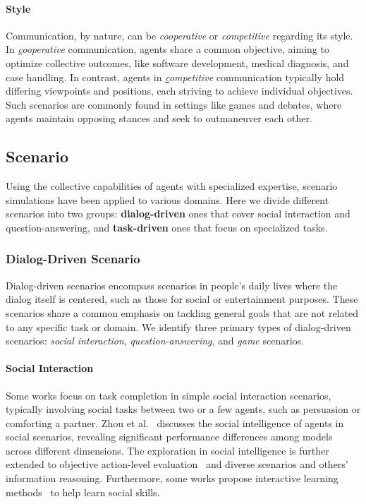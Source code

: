 \paragraph{Style}
Communication, by nature, can be \textit{cooperative} or \textit{competitive} regarding its style.
In \textit{{\ul cooperative}} communication, agents share a common objective, aiming to optimize collective outcomes, like software development\cite{dong2023self,qian2024chatdev,hong2023metagpt}, medical diagnosis\cite{tang2023medagents,fan2024ai}, and case handling\cite{hamilton2023blind,sun2024lawluo}.
In contrast, agents in \textit{{\ul competitive}} communication typically hold differing viewpoints and positions, each striving to achieve individual objectives. Such scenarios are commonly found in settings like games\cite{xu2023exploring,du2024helmsman,wang2023avalon} and debates\cite{xiong2023examining,liang2023encouraging,fu2023improving}, where agents maintain opposing stances and seek to outmaneuver each other.

\subsection{Scenario}\label{subsec:sce_sce}
Using the collective capabilities of agents with specialized expertise, scenario simulations have been applied to various domains. Here we divide different scenarios into two groups: \textbf{dialog-driven} ones that cover social interaction and question-answering, and \textbf{task-driven} ones that focus on specialized tasks.

\subsubsection{Dialog-Driven Scenario}
Dialog-driven scenarios encompass scenarios in people's daily lives where the dialog itself is centered, such as those for social or entertainment purposes.
These scenarios share a common emphasis on tackling general goals that are not related to any specific task or domain.
We identify three primary types of dialog-driven scenarios: \textit{social interaction}, \textit{question-answering}, and \textit{game} scenarios.


\paragraph{Social Interaction}
Some works focus on task completion in simple social interaction scenarios, typically involving social tasks between two or a few agents, such as persuasion or comforting a partner. Zhou et al.~\cite{zhou2023sotopia} discusses the social intelligence of agents in social scenarios, revealing significant performance differences among models across different dimensions. The exploration in social intelligence is further extended to objective action-level evaluation~\cite{wang2024towards} and diverse scenarios and others' information reasoning\cite{mou2024agentsense}. Furthermore, some works propose interactive learning methods~\cite{yang2024social,wang2024sotopia,zhou2024real} to help learn social skills.


